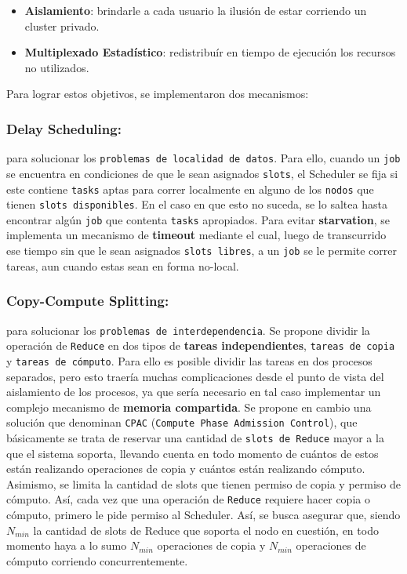 \documentclass[11pt, a4paper, twoside]{article}
\begin{document}
\begin{itemize}
    \item \textbf{Aislamiento}: brindarle a cada usuario la ilusión de estar
    corriendo un cluster privado.
    \item \textbf{Multiplexado Estadístico}: redistribuír en tiempo de ejecución
    los recursos no utilizados.
\end{itemize}

Para lograr estos objetivos, se implementaron dos mecanismos:

\subsubsection{Delay Scheduling:}
para solucionar los \texttt{problemas de localidad de
datos}. Para ello, cuando un \texttt{job} se encuentra en condiciones de que le
sean asignados \texttt{slots}, el Scheduler se fija si este contiene
\texttt{tasks} aptas para correr localmente en alguno de los \texttt{nodos} que
tienen \texttt{slots disponibles}. En el caso en que esto no suceda, se lo
saltea hasta encontrar algún \texttt{job} que contenta \texttt{tasks}
apropiados. Para evitar \textbf{starvation}, se implementa un mecanismo de
\textbf{timeout} mediante el cual, luego de transcurrido ese tiempo sin que le
sean asignados \texttt{slots libres}, a un \texttt{job} se le permite correr
tareas, aun cuando estas sean en forma no-local.

\subsubsection{Copy-Compute Splitting:}
para solucionar los \texttt{problemas de
interdependencia}. Se propone dividir la operación de \texttt{Reduce} en dos
tipos de \textbf{tareas independientes}, \texttt{tareas de copia} y
\texttt{tareas de cómputo}. Para ello es posible dividir las tareas en dos
procesos separados, pero esto traería muchas complicaciones desde el punto de
vista del aislamiento de los procesos, ya que sería necesario en tal caso
implementar un complejo mecanismo de \textbf{memoria compartida}. Se propone en
cambio una solución que denominan \texttt{CPAC} (\texttt{Compute Phase Admission
Control}), que básicamente se trata de reservar una cantidad de \texttt{slots de
Reduce} mayor a la que el sistema soporta, llevando cuenta en todo momento de
cuántos de estos están realizando operaciones de copia y cuántos están
realizando cómputo. Asimismo, se limita la cantidad de slots que tienen permiso
de copia y permiso de cómputo. Así, cada vez que una operación de
\texttt{Reduce} requiere hacer copia o cómputo, primero le pide permiso al
Scheduler. Así, se busca asegurar que, siendo $N_{min}$ la cantidad de slots de
Reduce que soporta el nodo en cuestión, en todo momento haya a lo sumo $N_{min}$
operaciones de copia y $N_{min}$ operaciones de cómputo corriendo
concurrentemente.
\end{document}
